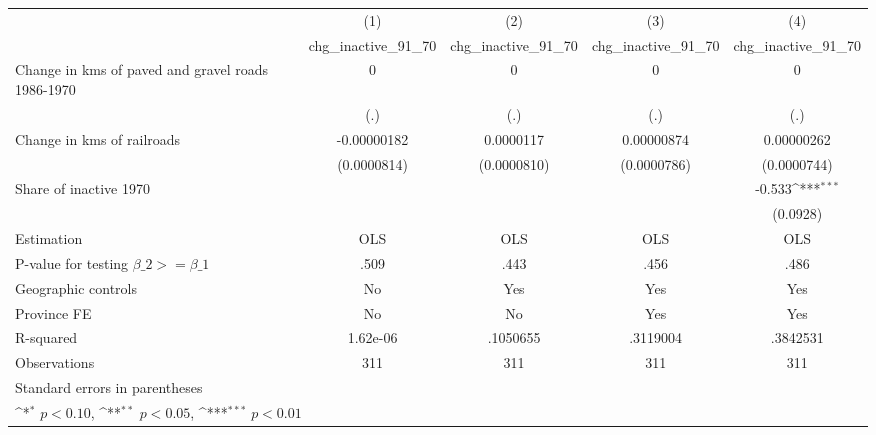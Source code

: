 {
\def\sym#1{\ifmmode^{#1}\else\(^{#1}\)\fi}
\begin{tabular}{l*{4}{c}}
\hline\hline
                    &\multicolumn{1}{c}{(1)}&\multicolumn{1}{c}{(2)}&\multicolumn{1}{c}{(3)}&\multicolumn{1}{c}{(4)}\\
                    &\multicolumn{1}{c}{chg\_inactive\_91\_70}&\multicolumn{1}{c}{chg\_inactive\_91\_70}&\multicolumn{1}{c}{chg\_inactive\_91\_70}&\multicolumn{1}{c}{chg\_inactive\_91\_70}\\
\hline
Change in kms of paved and gravel roads 1986-1970&           0         &           0         &           0         &           0         \\
                    &         (.)         &         (.)         &         (.)         &         (.)         \\
[1em]
Change in kms of railroads& -0.00000182         &   0.0000117         &  0.00000874         &  0.00000262         \\
                    & (0.0000814)         & (0.0000810)         & (0.0000786)         & (0.0000744)         \\
[1em]
Share of inactive 1970&                     &                     &                     &      -0.533\sym{***}\\
                    &                     &                     &                     &    (0.0928)         \\
\hline
Estimation          &         OLS         &         OLS         &         OLS         &         OLS         \\
P-value for testing $\beta\_2 >= \beta\_1$&        .509         &        .443         &        .456         &        .486         \\
Geographic controls &          No         &         Yes         &         Yes         &         Yes         \\
Province FE         &          No         &          No         &         Yes         &         Yes         \\
R-squared           &    1.62e-06         &    .1050655         &    .3119004         &    .3842531         \\
Observations        &         311         &         311         &         311         &         311         \\
\hline\hline
\multicolumn{5}{l}{\footnotesize Standard errors in parentheses}\\
\multicolumn{5}{l}{\footnotesize \sym{*} \(p<0.10\), \sym{**} \(p<0.05\), \sym{***} \(p<0.01\)}\\
\end{tabular}
}
